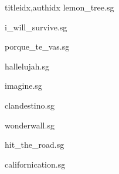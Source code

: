 \documentclass[12pt]{article}
\begin{document}
\begin{songs}{titleidx,authidx}
{lemon_tree.sg}


{i_will_survive.sg}


{porque_te_vas.sg}


{hallelujah.sg}


{imagine.sg}


{clandestino.sg}


{wonderwall.sg}


{hit_the_road.sg}


{californication.sg}



\end{songs}
\end{document}
